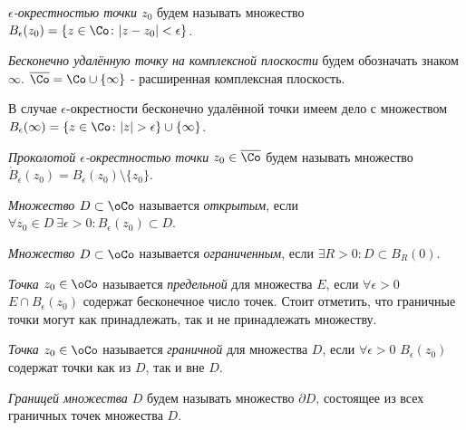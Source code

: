 
\begin{definition}
\textit{\(\epsilon\)-окрестностью точки \(z_0\)} будем называть множество \(B_\epsilon(z_0) = \{z
\in \Co \colon |z - z_0| < \epsilon\}\).
\end{definition}

\begin{definition}
\textit{Бесконечно удалённую точку на комплексной плоскости} будем обозначать знаком \(\infty\).
\(\overline{\Co} = \Co \cup \{\infty\}\) - расширенная комплексная плоскость.
\end{definition}

В случае \(\epsilon\)-окрестности бесконечно удалённой точки имеем дело с множеством \(B_\epsilon
(\infty) = \{z \in \Co \colon |z| > \epsilon\} \cup \{\infty\}\).

\begin{definition}
\textit{Проколотой \(\epsilon\)-окрестностью точки \(z_0 \in \overline{\Co}\)} будем называть
множество \(\mathring{B}_\epsilon(z_0) = B_\epsilon(z_0) \setminus \{z_0\}\).
\end{definition}

\begin{definition}
\textit{Множество \(D \subset \oCo\)} называется \textit{открытым}, если \(\forall z_0 \in D \
\exists \epsilon > 0 \colon B_\epsilon(z_0) \subset D\).
\end{definition}

\begin{definition}
\textit{Множество \(D \subset \oCo\)} называется \textit{ограниченным}, если \(\exists R > 0 \colon
D \subset B_R(0)\).
\end{definition}

\begin{definition}
\textit{Точка \(z_0 \in \oCo\)} называется \textit{предельной} для множества \(E\), если \(\forall
\epsilon > 0\) \(E \cap B_\epsilon(z_0)\) содержат бесконечное число точек. Стоит отметить, что
граничные точки могут как принадлежать, так и не принадлежать множеству.
\end{definition}

\begin{definition}
\textit{Точка \(z_0 \in \oCo\)} называется \textit{граничной} для множества \(D\), если \(\forall
\epsilon > 0\) \(B_\epsilon(z_0)\) содержат точки как из \(D\), так и вне \(D\).
\end{definition}

\begin{definition}
\textit{Границей множества \(D\)} будем называть множество \(\partial D\), состоящее из всех
граничных точек множества \(D\).
\end{definition}

